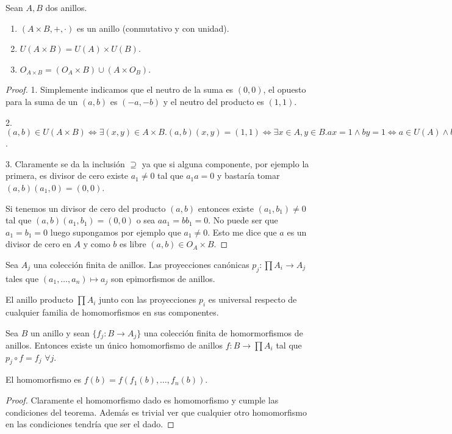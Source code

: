 \begin{proposition}
	Sean $A,B$ dos anillos.
	
	\begin{enumerate}
	\item $(A \times B,+,\cdot)$ es un anillo (conmutativo y con unidad). 
	\item $U(A \times B) = U(A) \times U(B)$. 
	\item $O_{A \times B} = (O_A \times B) \cup (A \times O_B)$.
	\end{enumerate}
\end{proposition}
\begin{proof}
	1. Simplemente indicamos que el neutro de la suma es $(0,0)$, el opuesto para la suma de un $(a,b)$ es $(-a,-b)$ y el neutro del producto es $(1,1)$. 
	
	2. $(a,b) \in U(A \times B) \iff \exists (x,y) \in A \times B. (a,b)(x,y) = (1,1) \iff \exists x \in A, y \in B. ax = 1 \land by = 1 \iff a \in U(A) \land b \in U(B) \iff  (a,b) \in U(A) \times U(B)$.
	
	3. Claramente se da la inclusión $\supseteq$ ya que si alguna componente, por ejemplo la primera, es divisor de cero existe $a_1 \neq 0$ tal que $a_1 a = 0$ y bastaría tomar $(a,b)(a_1,0) = (0,0)$.
	
	Si tenemos un divisor de cero del producto $(a,b)$ entonces existe $(a_1,b_1) \neq 0$ tal que $(a,b)(a_1,b_1) = (0,0)$ o sea $a a_1 = b b_1 = 0$. No puede ser que $a_1 = b_1 = 0$ luego supongamos por ejemplo que $a_1 \neq 0$. Esto me dice que $a$ es un divisor de cero en $A$ y como $b$ es libre $(a,b) \in O_A \times B$. 
\end{proof}


\begin{definition}
Sea $A_j$ una colección finita de anillos. Las proyecciones canónicas $p_j:\prod A_i \to A_j$ tales que $(a_1,\ldots,a_n) \mapsto a_j$ son epimorfismos de anillos. 
\end{definition}

El anillo producto $\prod A_i$ junto con las proyecciones $p_i$ es universal respecto de cualquier familia de homomorfismos en sus componentes. 

\begin{proposition}
Sea $B$ un anillo y sean $\{f_j:B \to A_j\}$ una colección finita de homormorfismos de anillos. Entonces existe un único homomorfismo de anillos $f:B \to \prod A_i$ tal que $p_j \circ f = f_j$ $\forall j$. 

El homomorfismo es $f(b) = f(f_1(b),\ldots,f_n(b))$.
\end{proposition}
\begin{proof}
Claramente el homomorfismo dado es homomorfismo y cumple las condiciones del teorema. Además es trivial ver que cualquier otro homomorfismo en las condiciones tendría que ser el dado. 
\end{proof}

